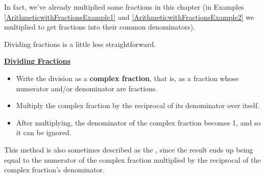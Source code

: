 In fact, we’ve already multiplied some fractions in this chapter (in Examples \ref{ArithmeticwithFractionsExample1} and \ref{ArithmeticwithFractionsExample2} we multiplied to get fractions into their common denominators).


Dividing fractions is a little less straightforward.

%
%

\begin{definition}
	\textbf{\underline{Dividing Fractions}}\\
	\bigskip
	\begin{itemize}[leftmargin=*]
		\item Write the division as a \textbf{complex fraction}, that is, as a fraction whose numerator and/or
		denominator are fractions.
		\item Multiply the complex fraction by the reciprocal of its denominator over itself.
		\item After multiplying, the denominator of the complex fraction becomes 1, and so it can be
		ignored. 
	\end{itemize}
\end{definition}

This method is also sometimes described as the , since the result ends up being equal to the numerator of the complex fraction multiplied by the reciprocal of the complex fraction’s denominator.



